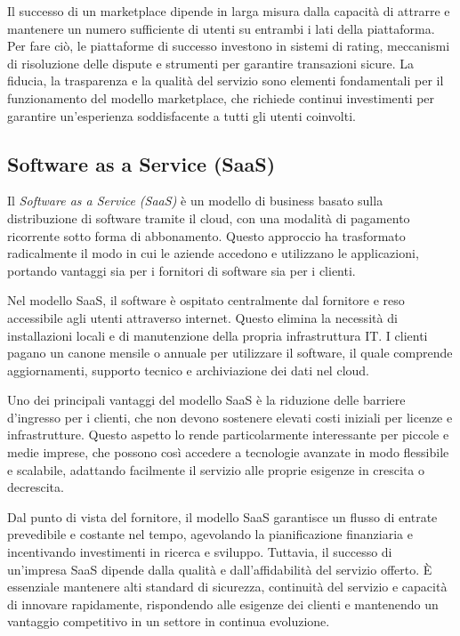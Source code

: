 Il successo di un marketplace dipende in larga misura dalla capacità di attrarre e mantenere un numero sufficiente di utenti su entrambi i lati della piattaforma. Per fare ciò, le piattaforme di successo investono in sistemi di rating, meccanismi di risoluzione delle dispute e strumenti per garantire transazioni sicure. La fiducia, la trasparenza e la qualità del servizio sono elementi fondamentali per il funzionamento del modello marketplace, che richiede continui investimenti per garantire un’esperienza soddisfacente a tutti gli utenti coinvolti.

\subsection*{Software as a Service (SaaS)}
Il \textit{Software as a Service (SaaS)} è un modello di business basato sulla distribuzione di software tramite il cloud, con una modalità di pagamento ricorrente sotto forma di abbonamento. Questo approccio ha trasformato radicalmente il modo in cui le aziende accedono e utilizzano le applicazioni, portando vantaggi sia per i fornitori di software sia per i clienti.

Nel modello SaaS, il software è ospitato centralmente dal fornitore e reso accessibile agli utenti attraverso internet. Questo elimina la necessità di installazioni locali e di manutenzione della propria infrastruttura IT. I clienti pagano un canone mensile o annuale per utilizzare il software, il quale comprende aggiornamenti, supporto tecnico e archiviazione dei dati nel cloud.

Uno dei principali vantaggi del modello SaaS è la riduzione delle barriere d’ingresso per i clienti, che non devono sostenere elevati costi iniziali per licenze e infrastrutture. Questo aspetto lo rende particolarmente interessante per piccole e medie imprese, che possono così accedere a tecnologie avanzate in modo flessibile e scalabile, adattando facilmente il servizio alle proprie esigenze in crescita o decrescita.

Dal punto di vista del fornitore, il modello SaaS garantisce un flusso di entrate prevedibile e costante nel tempo, agevolando la pianificazione finanziaria e incentivando investimenti in ricerca e sviluppo. Tuttavia, il successo di un’impresa SaaS dipende dalla qualità e dall’affidabilità del servizio offerto. È essenziale mantenere alti standard di sicurezza, continuità del servizio e capacità di innovare rapidamente, rispondendo alle esigenze dei clienti e mantenendo un vantaggio competitivo in un settore in continua evoluzione.


